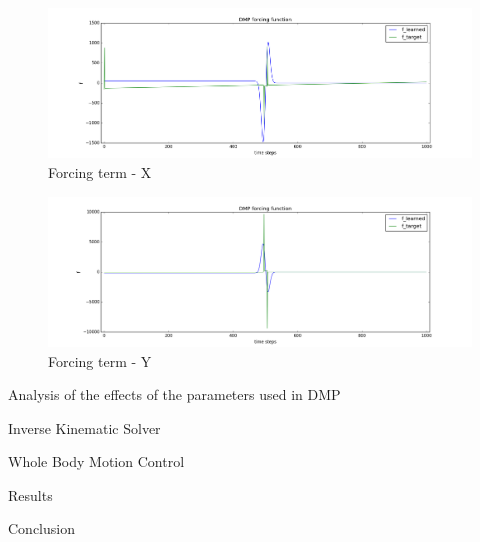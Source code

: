 \documentclass{beamer}
\begin{document}
	\begin{frame}
		\begin{figure}
			\includegraphics[scale=0.23]{images/f_x}
			\caption{Forcing term - X}
		\end{figure}

		\begin{figure}
			\includegraphics[scale=0.23]{images/f_y}
			\caption{Forcing term - Y}
		\end{figure}

	\end{frame}
	
	\begin{frame}{Analysis of the effects of the parameters used in DMP}
	
	\end{frame}
	
	\begin{frame}{Inverse Kinematic Solver}
		
	\end{frame}
	
	\begin{frame}{Whole Body Motion Control}
	
	\end{frame}
	
	\begin{frame}{Results}
	
	\end{frame}
	
	\begin{frame}{Conclusion}
	
	\end{frame}
\end{document}

